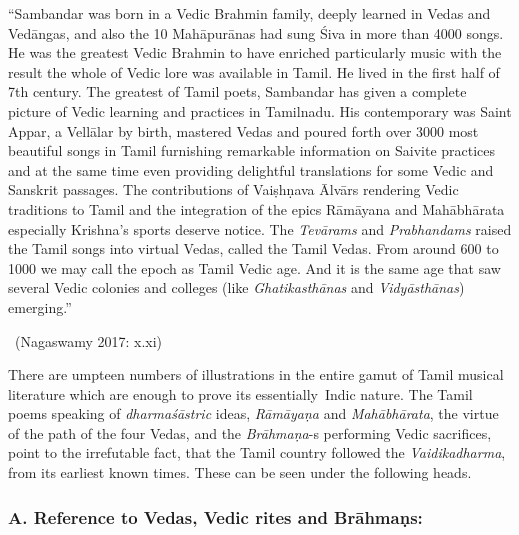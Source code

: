 \begin{myquote}
“Sambandar was born in a Vedic Brahmin family, deeply learned in Vedas and Vedāngas, and also the 10 Mahāpurānas had sung Śiva in more than 4000 songs. He was the greatest Vedic Brahmin to have enriched particularly music with the result the whole of Vedic lore was available in Tamil. He lived in the first half of 7th century. The greatest of Tamil poets, Sambandar has given a complete picture of Vedic learning and practices in Tamilnadu. His contemporary was Saint Appar, a Vellālar by birth, mastered Vedas and poured forth over 3000 most beautiful songs in Tamil furnishing remarkable information on Saivite practices and at the same time even providing delightful translations for some Vedic and Sanskrit passages. The contributions of Vaiṣhṇava Ālvārs rendering Vedic traditions to Tamil and the integration of the epics Rāmāyana and Mahābhārata especially Krishna’s sports deserve notice. The \textit{Tevārams} and \textit{Prabhandams} raised the Tamil songs into virtual Vedas, called the Tamil Vedas. From around 600 to 1000 we may call the epoch as Tamil Vedic age. And it is the same age that saw several Vedic colonies and colleges (like \textit{Ghatikasthānas} and \textit{Vidyāsthānas}) emerging.”

~\hfill (Nagaswamy 2017: x.xi)
\end{myquote}

There are umpteen numbers of illustrations in the entire gamut of Tamil musical literature which are enough to prove its essentially~Indic nature. The Tamil poems speaking of \textit{dharmaśāstric} ideas, \textit{Rāmāyaṇa} and \textit{Mahābhārata}, the virtue of the path of the four Vedas, and the \textit{Brāhmaṇa}-s performing Vedic sacrifices, point to the irrefutable fact, that the Tamil country followed the \textit{Vaidikadharma}, from its earliest known times. These can be seen under the following heads.

\subsubsection*{A. Reference to Vedas, Vedic rites and Brāhmaṇs:}

